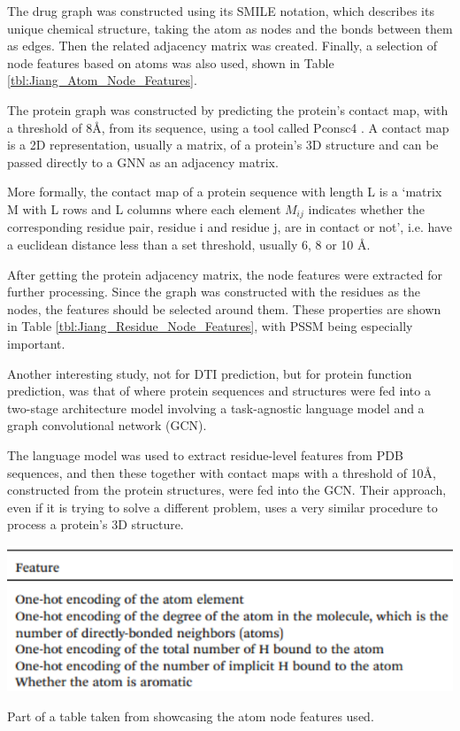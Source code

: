 The drug graph was constructed using its SMILE notation, which describes its unique chemical structure, taking the atom as nodes and the bonds between them as edges. Then the related adjacency matrix was created. Finally, a selection of node features based on atoms was also used, shown in Table \ref{tbl:Jiang_Atom_Node_Features}.

The protein graph was constructed by predicting the protein's contact map, with a threshold of 8\AA, from its sequence, using a tool called Pconsc4 \citep{Pconsc4}. A contact map is a 2D representation, usually a matrix, of a protein's 3D structure and can be passed directly to a GNN as an adjacency matrix. 

More formally, the contact map of a protein sequence with length L is a `matrix M with L rows and L columns where each element $M_{ij}$ indicates whether the corresponding residue pair, residue i and residue j, are in contact or not', i.e. have a euclidean distance less than a set threshold, usually 6, 8 or 10 \AA.

After getting the protein adjacency matrix, the node features were extracted for further processing. Since the graph was constructed with the residues as the nodes, the features should be selected around them. These properties are shown in Table \ref{tbl:Jiang_Residue_Node_Features}, with PSSM being especially important.

Another interesting study, not for DTI prediction, but for protein function prediction, was that of \citet{Gligorijević} where protein sequences and structures were fed into a two-stage architecture model involving a task-agnostic language model and a graph convolutional network (GCN). 

The language model was used to extract residue-level features from PDB sequences, and then these together with contact maps with a threshold of 10\AA, constructed from the protein structures, were fed into the GCN. Their approach, even if it is trying to solve a different problem, uses a very similar procedure to process a protein's 3D structure.

\begin{table}[!h]
  \centering
  \includegraphics[width=1.0\linewidth]{images/Jiang_Atom_Node_Features.pdf}
  \caption{Part of a table taken from \citet{Jiang2020} showcasing the atom node features used.}
  \label{tbl:Jiang_Atom_Node_Features}
\end{table}


